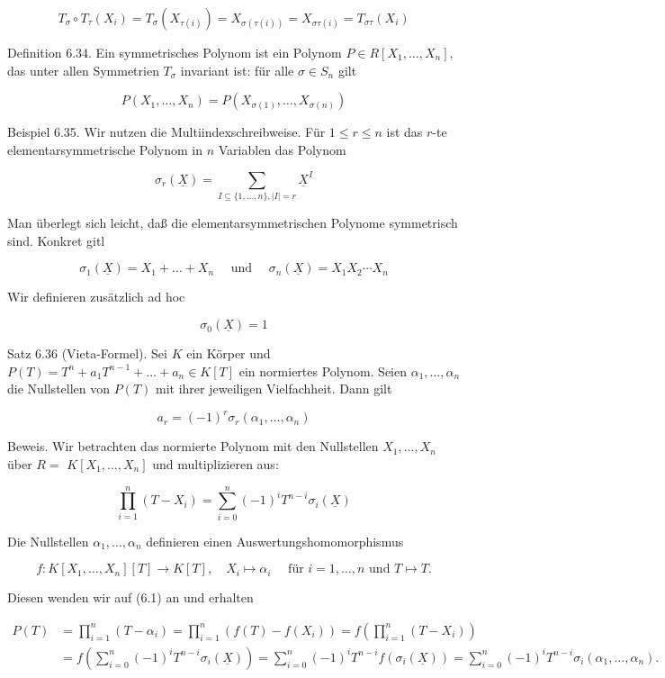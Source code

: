 \documentclass[10pt, letterpaper]{article}
\begin{document}
$$
T_{\sigma} \circ T_{\tau}\left(X_{i}\right)=T_{\sigma}\left(X_{\tau(i)}\right)=X_{\sigma(\tau(i))}=X_{\sigma \tau(i)}=T_{\sigma \tau}\left(X_{i}\right)
$$

Definition 6.34. Ein symmetrisches Polynom ist ein Polynom $P \in R\left[X_{1}, \ldots, X_{n}\right]$, das unter allen Symmetrien $T_{\sigma}$ invariant ist: für alle $\sigma \in S_{n}$ gilt

$$
P\left(X_{1}, \ldots, X_{n}\right)=P\left(X_{\sigma(1)}, \ldots, X_{\sigma(n)}\right)
$$

Beispiel 6.35. Wir nutzen die Multiindexschreibweise. Für $1 \leq r \leq n$ ist das $r$-te elementarsymmetrische Polynom in $n$ Variablen das Polynom

$$
\sigma_{r}(\underline{X})=\sum_{I \subseteq\{1, \ldots, n\},|I|=r} \underline{X}^{I}
$$

Man überlegt sich leicht, daß die elementarsymmetrischen Polynome symmetrisch sind. Konkret gitl

$$
\sigma_{1}(\underline{X})=X_{1}+\ldots+X_{n} \quad \text { und } \quad \sigma_{n}(\underline{X})=X_{1} X_{2} \cdots X_{n}
$$

Wir definieren zusätzlich ad hoc

$$
\sigma_{0}(\underline{X})=1
$$

Satz 6.36 (Vieta-Formel). Sei $K$ ein Körper und $P(T)=T^{n}+a_{1} T^{n-1}+\ldots+a_{n} \in K[T]$ ein normiertes Polynom. Seien $\alpha_{1}, \ldots, \alpha_{n}$ die Nullstellen von $P(T)$ mit ihrer jeweiligen Vielfachheit. Dann gilt

$$
a_{r}=(-1)^{r} \sigma_{r}\left(\alpha_{1}, \ldots, \alpha_{n}\right)
$$

Beweis. Wir betrachten das normierte Polynom mit den Nullstellen $X_{1}, \ldots, X_{n}$ über $R=$ $K\left[X_{1}, \ldots, X_{n}\right]$ und multiplizieren aus:

$$
\prod_{i=1}^{n}\left(T-X_{i}\right)=\sum_{i=0}^{n}(-1)^{i} T^{n-i} \sigma_{i}(\underline{X})
$$

Die Nullstellen $\alpha_{1}, \ldots, \alpha_{n}$ definieren einen Auswertungshomomorphismus

$$
f: K\left[X_{1}, \ldots, X_{n}\right][T] \rightarrow K[T], \quad X_{i} \mapsto \alpha_{i} \quad \text { für } i=1, \ldots, n \text { und } T \mapsto T .
$$

Diesen wenden wir auf (6.1) an und erhalten

$$
\begin{aligned}
P(T) & =\prod_{i=1}^{n}\left(T-\alpha_{i}\right)=\prod_{i=1}^{n}\left(f(T)-f\left(X_{i}\right)\right)=f\left(\prod_{i=1}^{n}\left(T-X_{i}\right)\right) \\
& =f\left(\sum_{i=0}^{n}(-1)^{i} T^{n-i} \sigma_{i}(\underline{X})\right)=\sum_{i=0}^{n}(-1)^{i} T^{n-i} f\left(\sigma_{i}(\underline{X})\right)=\sum_{i=0}^{n}(-1)^{i} T^{n-i} \sigma_{i}\left(\alpha_{1}, \ldots, \alpha_{n}\right) .
\end{aligned}
$$
\end{document}
